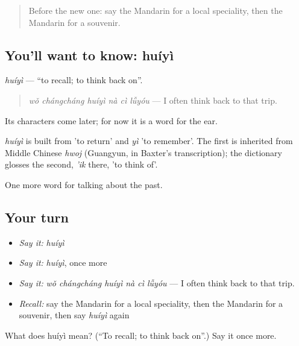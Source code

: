 \label{lesson:ZH-C247-huiyi}



\begin{quote}
Before the new one: say the Mandarin for a local speciality, then the Mandarin for a souvenir.
\end{quote}

\subsection*{You'll want to know: huíyì}
\emph{huíyì} — \textquotedblleft{}to recall; to think back on\textquotedblright{}.

\begin{quote}
\emph{wǒ chángcháng huíyì nà cì lǚyóu} — I often think back to that trip.
\end{quote}

Its characters come later; for now it is a word for the ear.

\begin{cousinweb}
\emph{huíyì} is built from  'to return' and \emph{yì} 'to remember'. The first is inherited from Middle Chinese \emph{hwoj} (Guangyun, in Baxter's transcription); the dictionary glosses the second, \emph{'ik} there, 'to think of'.
\end{cousinweb}

\begin{grammarlens}[title={What you've built}]
One more word for talking about the past.
\end{grammarlens}

\subsection*{Your turn}
\begin{itemize}
\raggedright
  \item \emph{Say it:} \emph{huíyì}
  \item \emph{Say it:} \emph{huíyì}, once more
  \item \emph{Say it:} \emph{wǒ chángcháng huíyì nà cì lǚyóu} — I often think back to that trip.
  \item \emph{Recall:} say the Mandarin for a local speciality, then the Mandarin for a souvenir, then say \emph{huíyì} again
\end{itemize}

\begin{tcolorbox}[breakable,colback=teal!4,colframe=teal!35!black,title={Before you move on}]
What does huíyì mean? (\textquotedblleft{}To recall; to think back on\textquotedblright{}.) Say it once more.
\end{tcolorbox}
